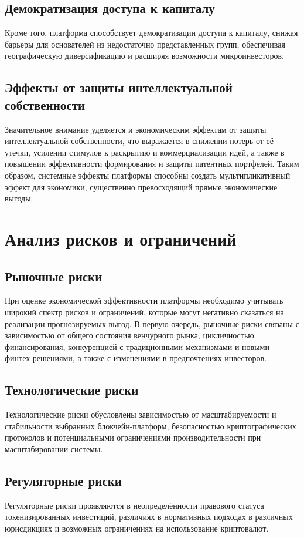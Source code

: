 \documentclass[
    candidate, %
    subf, %
    dotsinheaders=false,
]{disser}
\begin{document}
\subsection{Демократизация доступа к капиталу}
Кроме того, платформа способствует демократизации доступа к капиталу, снижая барьеры для основателей из недостаточно представленных групп, обеспечивая географическую диверсификацию и расширяя возможности микроинвесторов.

\subsection{Эффекты от защиты интеллектуальной собственности}
Значительное внимание уделяется и экономическим эффектам от защиты интеллектуальной собственности, что выражается в снижении потерь от её утечки, усилении стимулов к раскрытию и коммерциализации идей, а также в повышении эффективности формирования и защиты патентных портфелей. Таким образом, системные эффекты платформы способны создать мультипликативный эффект для экономики, существенно превосходящий прямые экономические выгоды.

\section{Анализ рисков и ограничений}

\subsection{Рыночные риски}
При оценке экономической эффективности платформы необходимо учитывать широкий спектр рисков и ограничений, которые могут негативно сказаться на реализации прогнозируемых выгод. В первую очередь, рыночные риски связаны с зависимостью от общего состояния венчурного рынка, цикличностью финансирования, конкуренцией с традиционными механизмами и новыми финтех-решениями, а также с изменениями в предпочтениях инвесторов.

\subsection{Технологические риски}
Технологические риски обусловлены зависимостью от масштабируемости и стабильности выбранных блокчейн-платформ, безопасностью криптографических протоколов и потенциальными ограничениями производительности при масштабировании системы.

\subsection{Регуляторные риски}
Регуляторные риски проявляются в неопределённости правового статуса токенизированных инвестиций, различиях в нормативных подходах в различных юрисдикциях и возможных ограничениях на использование криптовалют.
\end{document}
